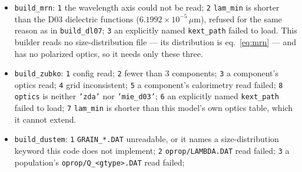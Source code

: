\documentclass{my_memo}
\newcommand{\code}[1]{\texttt{#1}}
\newcommand{\um}{\ensuremath{\,\mu\mathrm{m}}}
\begin{document}
\begin{itemize}
      default degrades gracefully instead);
      \code{5} \code{load\_polarized\_optics=.false.} combined with an explicit
      \code{qpol\_*}/\code{scatmat\_path} (a contradiction);
      \code{6} the astrodust dielectric function failed to load (raised only
      when \code{lam\_min} asks for the EUV band);
      \code{7} \code{lam\_min} is shorter than that dielectric function's own
      shortest wavelength ($1.00003\times10^{-4}$\um), refused for the same
      reason as above;
      \code{8} the polarized table's wavelength grid does not sit node for node
      on the long-wavelength end of the model's grid (a companion EUV table that
      is simply \emph{missing} is not an error --- that band degrades to the
      announced zero of \S\ref{sec:euv-pol});
      \code{9} the EUV part of the grid runs outside the wavelengths a supplied
      companion table covers ($0.0124$--$0.0912$\um);
      \code{10} an explicitly named \code{kext\_path} failed to load;
      \code{11} \code{euv\_tmatrix = .true.} but the spheroid optics of a band
      below the $Q$ table are not available (unreachable with the shipped table,
      which leaves no such band).
      \textbf{Codes 6 and 7 are 3 and 4 in the scalar branch (v1.00)}, which
      has no polarized inputs to occupy 3--5.
\item \code{build\_mrn}: \code{1} the wavelength axis could not be read;
      \code{2} \code{lam\_min} is shorter than the D03 dielectric functions
      ($6.1992\times10^{-5}$\um), refused for the same reason as in
      \code{build\_dl07};
      \code{3} an explicitly named \code{kext\_path} failed to load.
      This builder reads no size-distribution file --- its distribution is
      eq.~\eqref{eq:mrn} --- and has no polarized optics, so it needs only
      these three.
\item \code{build\_zubko}: \code{1} config read; \code{2} fewer than 3 components;
      \code{3} a component's optics read; \code{4} grid inconsistent;
      \code{5} a component's calorimetry read failed;
      \code{8} \code{optics} is neither \code{'zda'} nor \code{'mie\_d03'};
      \code{6} an explicitly named \code{kext\_path} failed to load;
      \code{7} \code{lam\_min} is shorter than this model's own optics table,
      which it cannot extend.
\item \code{build\_dustem}: \code{1} \code{GRAIN\_*.DAT} unreadable, or it names
      a size-distribution keyword this code does not implement;
      \code{2} \code{oprop/LAMBDA.DAT} read failed;
      \code{3} a population's \code{oprop/Q\_<gtype>.DAT} read failed;

\end{itemize}
\end{document}
